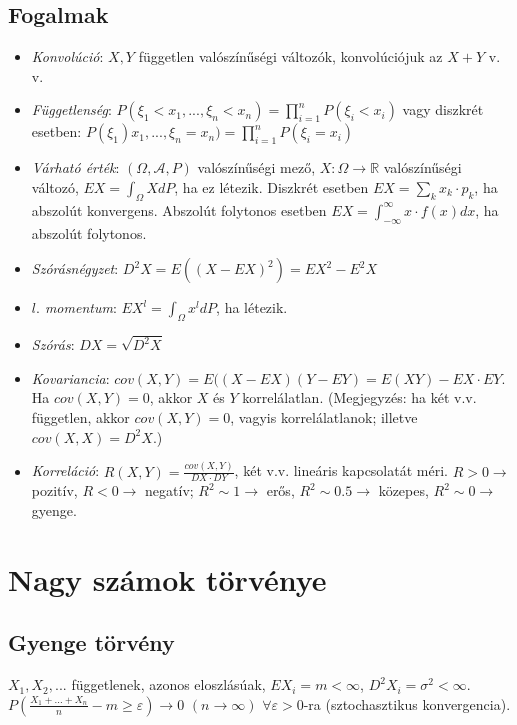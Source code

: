 \documentclass[margin=0px]{article}
\begin{document}
	\subsection{Fogalmak}
	
	\begin{itemize}
		\item \textit{Konvolúció}: $X,Y$ független valószínűségi változók, konvolúciójuk az $X+Y$ v. v.
		\item \textit{Függetlenség}: $P(\xi_1<x_1, ..., \xi_n<x_n) = \prod_{i=1}^{n}{P(\xi_i<x_i)}$ vagy diszkrét esetben: $P(\xi_1)x_1, ..., \xi_n=x_n) = \prod_{i=1}^{n}{P(\xi_i=x_i)}$
		\item \textit{Várható érték}: $(\Omega, \mathcal{A}, P)$ valószínűségi mező, $X:\Omega \to \mathbb{R}$ valószínűségi változó, $EX = \int_{\Omega}{XdP}$, ha ez létezik. Diszkrét esetben $EX = \sum_{k}{x_k \cdot p_k}$, ha abszolút konvergens. Abszolút folytonos esetben $EX = \int_{-\infty}^{\infty}{x \cdot f(x)dx}$, ha abszolút folytonos.
		\item \textit{Szórásnégyzet}: $D^{2}X = E((X-EX)^2) = EX^2-E^{2}X$
		\item \textit{$l.$ momentum}: $EX^l = \int_{\Omega}{x^{l}dP}$, ha létezik.
		\item \textit{Szórás}: $DX = \sqrt{D^{2}X}$
		\item \textit{Kovariancia}: $cov(X,Y) = E((X-EX)(Y-EY) = E(XY) - EX \cdot EY$. Ha $cov(X,Y) = 0$, akkor $X$ és $Y$ korrelálatlan. (Megjegyzés: ha két v.v. független, akkor $cov(X,Y) = 0$, vagyis korrelálatlanok; illetve $cov(X,X) = D^{2}X$.)
		\item \textit{Korreláció}: $R(X,Y) = \frac{cov(X,Y)}{DX \cdot DY}$, két v.v. lineáris kapcsolatát méri. $R>0 \to$ pozitív, $R<0 \to$ negatív; $R^2 \sim 1 \to$ erős, $R^2 \sim 0.5 \to$ közepes, $R^2 \sim 0 \to$ gyenge.
	\end{itemize}
	
	\section{Nagy számok törvénye}
	
	\subsection{Gyenge törvény}
	
	$X_1, X_2, ...$ függetlenek, azonos eloszlásúak, $EX_i = m < \infty$, $D^{2}X_i = \sigma^2 < \infty$. \\
	$P(\frac{X_1 + ... + X_n}{n} - m \geq \varepsilon) \rightarrow 0$ $(n \to \infty)$ $\forall \varepsilon > 0$-ra (sztochasztikus konvergencia).
	
\end{document}
